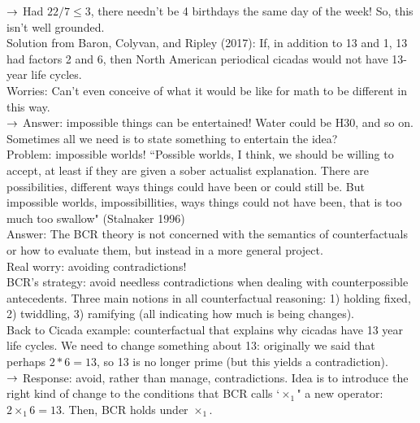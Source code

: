 $\rightarrow$ Had $22/7 \leq 3$, there needn't be 4 birthdays the same day of the week! So, this isn't well grounded. \\


Solution from Baron, Colyvan, and Ripley (2017): If, in addition to 13 and 1, 13 had factors 2 and 6, then North American periodical cicadas would not have 13-year life cycles. \\

Worries: Can't even conceive of what it would be like for math to be different in this way. \\

$\rightarrow$ Answer: impossible things can be entertained! Water could be H30, and so on. Sometimes all we need is to state something to entertain the idea? \\

Problem: impossible worlds! ``Possible worlds, I think, we should be willing to accept, at least if they are given a sober actualist explanation. There are possibilities, different ways things could have been or could still be. But impossible worlds, impossibillities, ways things could not have been, that is too much too swallow" (Stalnaker 1996) \\

Answer: The BCR theory is not concerned with the semantics of counterfactuals or how to evaluate them, but instead in a more general project. \\

Real worry: avoiding contradictions! \\

BCR's strategy: avoid needless contradictions when dealing with counterpossible antecedents. Three main notions in all counterfactual reasoning: 1) holding fixed, 2) twiddling, 3) ramifying (all indicating how much is being changes). \\

Back to Cicada example: counterfactual that explains why cicadas have 13 year life cycles. We need to change something about 13: originally we said that perhaps $2*6=13$, so 13 is no longer prime (but this yields a contradiction). \\

$\rightarrow$ Response: avoid, rather than manage, contradictions. Idea is to introduce the right kind of change to the conditions that BCR calls `$\times_1$" a new operator: $2 \times_1 6 = 13$. Then, BCR holds under $\times_1$. \\

